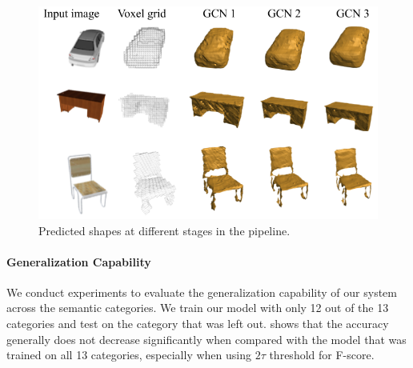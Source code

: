 \begin{figure}[th!]
    \begin{center}
        \includegraphics[width=\linewidth]{imgs/gcn_stages.png}
    \end{center}
        \caption{Predicted shapes at different stages in the pipeline.}
        \label{fig:gcn_stages}
\end{figure}

\vspace{-2mm}
\paragraph{Generalization Capability}
We conduct experiments to evaluate the generalization capability of our system across the semantic categories. We train our model with only 12 out of the 13 categories and test on the category that was left out.  shows that the accuracy generally does not decrease significantly when compared with the model that was trained on all 13 categories, especially when using $2\tau$ threshold for F-score.

